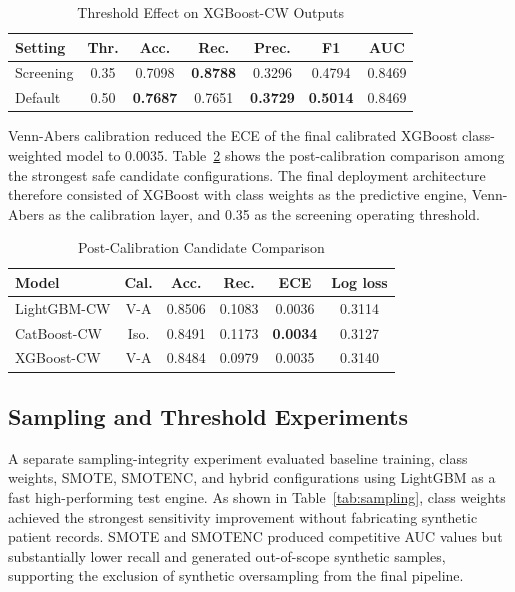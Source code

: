 \documentclass[journal]{IEEEtran}
\begin{document}
\begin{table}[!t]
\caption{Threshold Effect on XGBoost-CW Outputs}
\label{tab:threshold}
\centering
\scriptsize
\begin{tabular}{lcccccc}
\toprule
Setting & Thr. & Acc. & Rec. & Prec. & F1 & AUC\\
\midrule
Screening & 0.35 & 0.7098 & \textbf{0.8788} & 0.3296 & 0.4794 & 0.8469\\
Default & 0.50 & \textbf{0.7687} & 0.7651 & \textbf{0.3729} & \textbf{0.5014} & 0.8469\\
\bottomrule
\end{tabular}
\end{table}

Venn-Abers calibration reduced the ECE of the final calibrated XGBoost class-weighted model to 0.0035. Table~\ref{tab:calshootout} shows the post-calibration comparison among the strongest safe candidate configurations. The final deployment architecture therefore consisted of XGBoost with class weights as the predictive engine, Venn-Abers as the calibration layer, and 0.35 as the screening operating threshold.

\begin{table}[!t]
\caption{Post-Calibration Candidate Comparison}
\label{tab:calshootout}
\centering
\scriptsize
\begin{tabular}{lccccc}
\toprule
Model & Cal. & Acc. & Rec. & ECE & Log loss\\
\midrule
LightGBM-CW & V-A & 0.8506 & 0.1083 & 0.0036 & 0.3114\\
CatBoost-CW & Iso. & 0.8491 & 0.1173 & \textbf{0.0034} & 0.3127\\
XGBoost-CW & V-A & 0.8484 & 0.0979 & 0.0035 & 0.3140\\
\bottomrule
\end{tabular}
\end{table}

\subsection{Sampling and Threshold Experiments}
A separate sampling-integrity experiment evaluated baseline training, class weights, SMOTE, SMOTENC, and hybrid configurations using LightGBM as a fast high-performing test engine. As shown in Table~\ref{tab:sampling}, class weights achieved the strongest sensitivity improvement without fabricating synthetic patient records. SMOTE and SMOTENC produced competitive AUC values but substantially lower recall and generated out-of-scope synthetic samples, supporting the exclusion of synthetic oversampling from the final pipeline.
\end{document}
